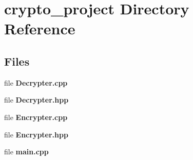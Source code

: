 \section{crypto\+\_\+project Directory Reference}
\label{dir_5f09d7b9fa761d3bdd5c9064445ed7c0}
\subsection*{Files}
\begin{DoxyCompactItemize}
\item 
file \textbf{ Decrypter.\+cpp}
\item 
file \textbf{ Decrypter.\+hpp}
\item 
file \textbf{ Encrypter.\+cpp}
\item 
file \textbf{ Encrypter.\+hpp}
\item 
file \textbf{ main.\+cpp}
\end{DoxyCompactItemize}
